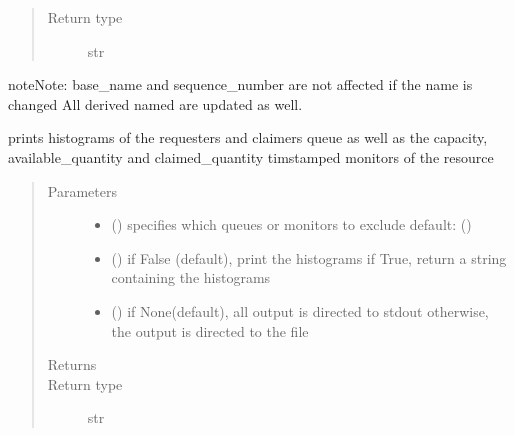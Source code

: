 \documentclass[letterpaper,10pt,english]{sphinxmanual}
\begin{document}
\begin{fulllineitems}
\begin{fulllineitems}
\begin{quote}
\begin{description}
\item[{Return type}] \leavevmode
str

\end{description}\end{quote}

\begin{sphinxadmonition}{note}{Note:}
base\_name and sequence\_number are not affected if the name is changed 
All derived named are updated as well.
\end{sphinxadmonition}

\end{fulllineitems}


\begin{fulllineitems}
\label{\detokenize{Reference:salabim.Resource.print_histograms}}
prints histograms of the requesters and claimers queue as well as
the capacity, available\_quantity and claimed\_quantity timstamped monitors of the resource
\begin{quote}\begin{description}
\item[{Parameters}] \leavevmode\begin{itemize}
\item {} 
 () \textendash{} specifies which queues or monitors to exclude 
default: ()

\item {} 
 () \textendash{} if False (default), print the histograms
if True, return a string containing the histograms

\item {} 
 () \textendash{} if None(default), all output is directed to stdout 
otherwise, the output is directed to the file

\end{itemize}

\item[{Returns}] \leavevmode
{}

\item[{Return type}] \leavevmode
str


\end{description}
\end{quote}
\end{fulllineitems}
\end{fulllineitems}
\end{document}
